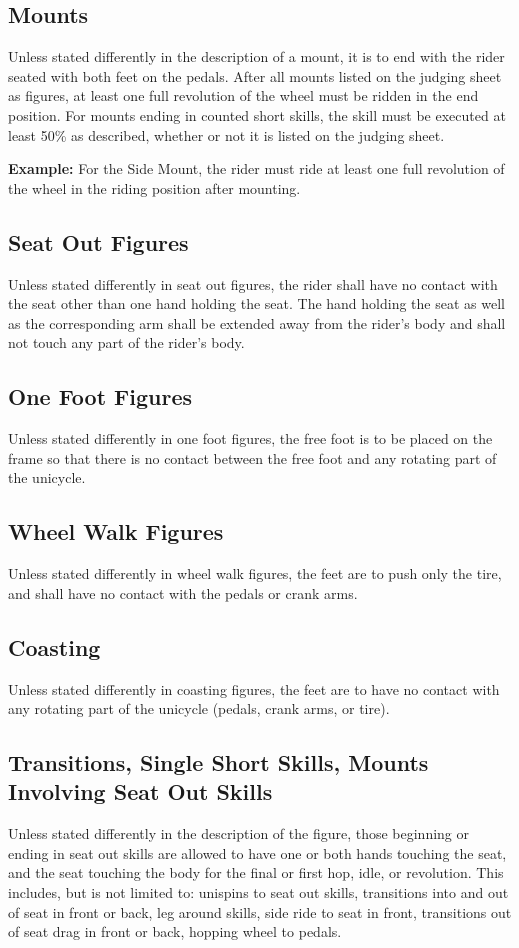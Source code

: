 \subsection{Mounts}
Unless stated differently in the description of a mount, it is to end with the rider seated with both feet on the pedals.
After all mounts listed on the judging sheet as figures, at least one full revolution of the wheel must be ridden in the end position.
For mounts ending in counted short skills, the skill must be executed at least 50\% as described, whether or not it is listed on the judging sheet.

\textbf{Example:} For the Side Mount, the rider must ride at least one full revolution of the wheel in the riding position after mounting.

\subsection{Seat Out Figures}
Unless stated differently in seat out figures, the rider shall have no contact with the seat other than one hand holding the seat.
The hand holding the seat as well as the corresponding arm shall be extended away from the rider's body and shall not touch any part of the rider's body.

\subsection{One Foot Figures}
Unless stated differently in one foot figures, the free foot is to be placed on the frame so that there is no contact between the free foot and any rotating part of the unicycle.

\subsection{Wheel Walk Figures}
Unless stated differently in wheel walk figures, the feet are to push only the tire, and shall have no contact with the pedals or crank arms.

\subsection{Coasting}
Unless stated differently in coasting figures, the feet are to have no contact with any rotating part of the unicycle (pedals, crank arms, or tire).

\subsection{Transitions, Single Short Skills, Mounts Involving Seat Out Skills}
Unless stated differently in the description of the figure, those beginning or ending in seat out skills are allowed to have one or both hands touching the seat, and the seat touching the body for the final or first hop, idle, or revolution.
This includes, but is not limited to: unispins to seat out skills, transitions into and out of seat in front or back, leg around skills, side ride to seat in front, transitions out of seat drag in front or back, hopping wheel to pedals.


